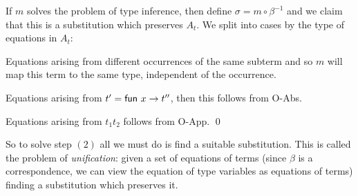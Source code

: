 If $m$ solves the problem of type inference, then define $\sigma=m\circ\beta^{-1}$ and we claim that this is a substitution which preserves $A_t$.
We split into cases by the type of equations in $A_t$:
\benum
    \item Equations arising from different occurrences of the same subterm and so $m$ will map this term to the same type, independent of the occurrence.
    \item Equations arising from $t'=\fun x\to t''$, then this follows from {\tensc O-Abs}.
    \item Equations arising from $t_1t_2$ follows from {\tensc O-App}.
    \qed
\eenum

So to solve step $(2)$ all we must do is find a suitable substitution.
This is called the problem of {\it unification}: given a set of equations of terms (since $\beta$ is a correspondence, we can view the equation of type variables as equations of terms) finding a
substitution which preserves it.

